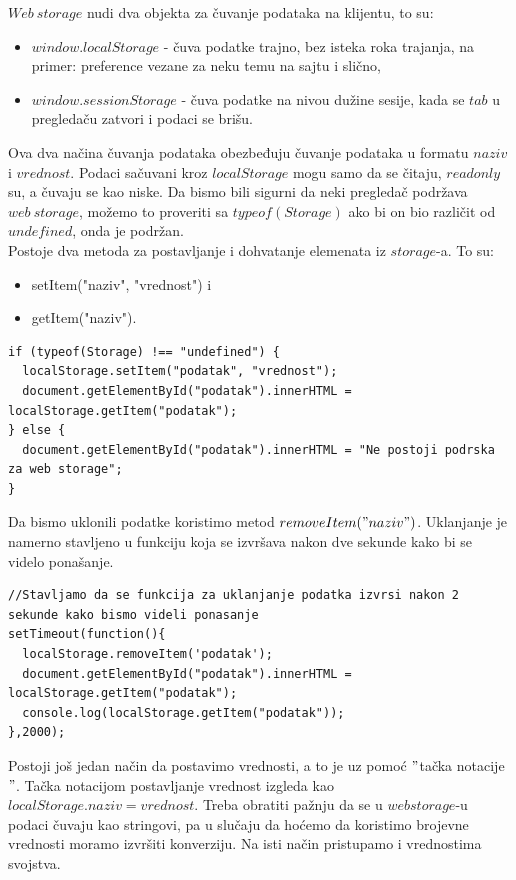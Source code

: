 $Web\ storage$ nudi dva objekta za čuvanje podataka na klijentu, to su:
\begin{itemize}
\item $window.localStorage$ - čuva podatke trajno, bez isteka roka trajanja, na primer: preference vezane za neku temu na sajtu i slično,
\item $window.sessionStorage$ - čuva podatke na nivou dužine sesije, kada se $tab$ u pregledaču zatvori i podaci se brišu.
\end{itemize}
Ova dva načina čuvanja podataka obezbeđuju čuvanje podataka u formatu $naziv$ i $vrednost$. Podaci sačuvani kroz $localStorage$ mogu samo da se čitaju, $read only$ su, a čuvaju se kao niske.
Da bismo bili sigurni da neki pregledač podržava $web\ storage$, možemo to proveriti sa $typeof(Storage)$ ako bi on bio različit od $undefined$, onda je podržan.\\
Postoje dva metoda za postavljanje i dohvatanje elemenata iz $storage$-a. To su:
\begin{itemize}
\item setItem("naziv", "vrednost") i 
\item getItem("naziv").
\end{itemize}
\begin{lstlisting}[backgroundcolor = \color{lightgray}, breaklines=true]
if (typeof(Storage) !== "undefined") {
  localStorage.setItem("podatak", "vrednost");
  document.getElementById("podatak").innerHTML = localStorage.getItem("podatak");
} else {
  document.getElementById("podatak").innerHTML = "Ne postoji podrska za web storage";
}
\end{lstlisting}

Da bismo uklonili podatke koristimo metod $removeItem("naziv")$. Uklanjanje je namerno stavljeno u funkciju koja se izvršava nakon dve sekunde kako bi se videlo ponašanje.

\begin{lstlisting}[backgroundcolor = \color{lightgray}, breaklines=true]
//Stavljamo da se funkcija za uklanjanje podatka izvrsi nakon 2 sekunde kako bismo videli ponasanje
setTimeout(function(){
  localStorage.removeItem('podatak');
  document.getElementById("podatak").innerHTML = localStorage.getItem("podatak");
  console.log(localStorage.getItem("podatak"));
},2000);
\end{lstlisting}

Postoji još jedan način da postavimo vrednosti, a to je uz pomoć $"$tačka notacije$"$. Tačka notacijom postavljanje vrednost izgleda kao $localStorage.naziv = vrednost$. Treba obratiti pažnju da se u $web storage$-u podaci čuvaju kao stringovi, pa u slučaju da hoćemo da koristimo brojevne vrednosti moramo izvršiti konverziju. Na isti način pristupamo i vrednostima svojstva. 

